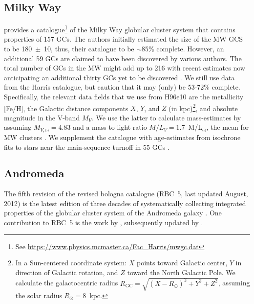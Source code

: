 \documentclass[a4paper,fleqn,usenatbib]{mnras}
\begin{document}
\subsection{Milky Way}
\label{sec:milkyway}
\citet[][2010 edition; hereafter H96e10]{1996AJ....112.1487H} provides a
catalogue\footnote{See \url{https://www.physics.mcmaster.ca/Fac_Harris/mwgc.dat}}
of the Milky Way globular cluster system that contains properties of
157 GCs. The authors initially estimated the size of the MW GCS to be 180~$\pm$~10,
thus, their catalogue to be ${\sim}$85\% complete. However, an additional 59 GCs
are claimed to have been discovered by various authors. The total number of GCs
in the MW might add up to 216 with recent estimates now anticipating an additional 
thirty GCs yet to be discovered \citep[e.g.][and references therein]{2018ApJ...863L..38R}.
We still use data from the Harris catalogue, but caution that it may (only) be
53-72\% complete. Specifically, the relevant data fields that we use from H96e10
are the metallicity [Fe/H], the Galactic distance components $X$, $Y$, and $Z$ (in
kpc)\footnote{In a Sun-centered coordinate system: $X$ points toward Galactic
center, $Y$ in direction of Galactic rotation, and $Z$ toward the North Galactic
Pole. We calculate the galactocentric radius $R_{\text{GC}}=\sqrt{(X-R_\odot)^2
+ Y^2 + Z^2}$, assuming the solar radius $R_\odot=8$~kpc.}, and absolute
magnitude in the V-band $M_V$. We use the latter to calculate mass-estimates by
assuming $M_{V,\odot}=4.83$ and a mass to light ratio $M/L_V = 1.7$~M/L$_{\odot}$,
the mean for MW clusters \citep{2005ApJS..161..304M}. We supplement the catalogue
with age-estimates from isochrone fits to stars near the main-sequence turnoff 
in 55 GCs \citep[][hereafter V13]{2013ApJ...775..134V}.


\subsection{Andromeda}
\label{sec:andromeda}
The fifth revision of the revised bologna catalogue (RBC~5, last updated
August, 2012) is the latest edition of three decades of systematically
collecting integrated properties of the globular cluster system of the
Andromeda galaxy \citep[][and references therein]{2004A&A...416..917G}. One
contribution to RBC~5 is the work by \citet[][hereafter C11]{2011AJ....141...61C},
subsequently updated by \citet[][hereafter CR16]{2016ApJ...824...42C}.
\end{document}
